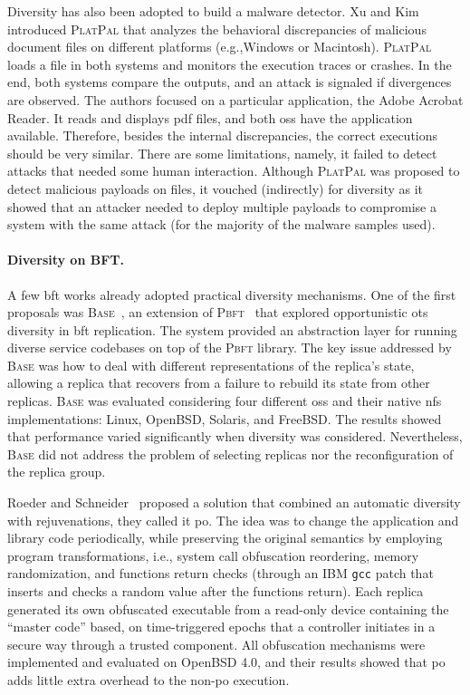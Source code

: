 Diversity has also been adopted to build a malware detector. 
Xu and Kim~\cite{Xu:2017} introduced \textsc{PlatPal} that analyzes the behavioral discrepancies of malicious document files on different platforms (e.g.,Windows or Macintosh).
\textsc{PlatPal} loads a file in both systems and monitors the execution traces or crashes. 
In the end, both systems compare the outputs, and an attack is signaled if divergences are observed.
The authors focused on a particular application, the Adobe Acrobat Reader.
It reads and displays pdf files, and both \glspl{os} have the application available.
Therefore, besides the internal discrepancies, the correct executions should be very similar.
There are some limitations, namely, it failed to detect attacks that needed some human interaction.
Although \textsc{PlatPal} was proposed to detect malicious payloads on files, it vouched (indirectly) for diversity as it showed that an attacker needed to deploy multiple payloads to compromise a system with the same attack (for the majority of the malware samples used).

\paragraph{Diversity on BFT.}
A few \gls{bft} works already adopted practical diversity mechanisms. 
One of the first proposals was \textsc{Base}~\cite{Castro:2003}, an extension of \textsc{Pbft}~\cite{Castro:1999} that explored opportunistic \gls{ots} diversity in \gls{bft} replication.
The system provided an abstraction layer for running diverse service codebases on top of the \textsc{Pbft} library.
The key issue addressed by \textsc{Base} was how to deal with different representations of the replica's state, allowing a replica that recovers from a failure to rebuild its state from other replicas. 
\textsc{Base} was evaluated considering four different \glspl{os} and their native \gls{nfs} implementations: Linux, OpenBSD, Solaris, and FreeBSD.
The results showed that performance varied significantly when diversity was considered.
Nevertheless, \textsc{Base} did not address the problem of selecting replicas nor the reconfiguration of the replica group.

Roeder and Schneider~\cite{Roeder:2010} proposed a solution that combined an automatic diversity with rejuvenations, they called it \gls{po}.
The idea was to change the application and library code periodically, while preserving the original semantics by employing program transformations, i.e., system call obfuscation reordering, memory randomization, and functions return checks (through an IBM \texttt{gcc} patch that inserts and checks a random value after the functions return).
Each replica generated its own obfuscated executable from a read-only device containing the ``master code'' based, on time-triggered epochs that a controller initiates in a secure way through a trusted component.
All obfuscation mechanisms were implemented and evaluated on OpenBSD 4.0, and their results showed that \gls{po} adds little extra overhead to the non-\gls{po} execution.

